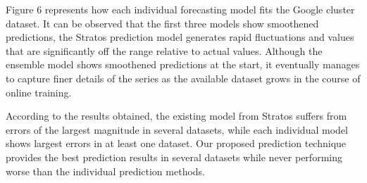 Figure 6 represents how each individual forecasting model fits the Google cluster dataset. It can be observed that the first three models show smoothened predictions, the Stratos prediction model generates rapid fluctuations and values that are significantly off the range relative to actual values. Although the ensemble model shows smoothened predictions at the start, it eventually manages to capture finer details of the series as the available dataset grows in the course of online training.

According to the results obtained, the existing model from Stratos suffers from errors of the largest magnitude in several datasets, while each individual model shows largest errors in at least one dataset. Our proposed prediction technique provides the best prediction results in several datasets while never performing worse than the individual prediction methods.